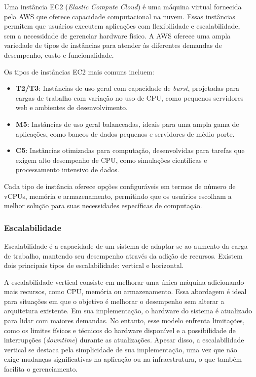 Uma instância EC2 (\emph{Elastic Compute Cloud}) é uma máquina virtual fornecida pela AWS que oferece capacidade computacional na nuvem. Essas instâncias permitem que usuários executem aplicações com flexibilidade e escalabilidade, sem a necessidade de gerenciar hardware físico. A AWS oferece uma ampla variedade de tipos de instâncias para atender às diferentes demandas de desempenho, custo e funcionalidade.

Os tipos de instâncias EC2 mais comuns incluem:

\begin{itemize}
    \item \textbf{T2/T3}: Instâncias de uso geral com capacidade de \emph{burst}, projetadas para cargas de trabalho com variação no uso de CPU, como pequenos servidores web e ambientes de desenvolvimento.
    \item \textbf{M5}: Instâncias de uso geral balanceadas, ideais para uma ampla gama de aplicações, como bancos de dados pequenos e servidores de médio porte.
    \item \textbf{C5}: Instâncias otimizadas para computação, desenvolvidas para tarefas que exigem alto desempenho de CPU, como simulações científicas e processamento intensivo de dados.
\end{itemize}

Cada tipo de instância oferece opções configuráveis em termos de número de vCPUs, memória e armazenamento, permitindo que os usuários escolham a melhor solução para suas necessidades específicas de computação.

\subsubsection{Escalabilidade}



Escalabilidade é a capacidade de um sistema de adaptar-se ao aumento da carga de trabalho, mantendo seu desempenho através da adição de recursos. Existem dois principais tipos de escalabilidade: vertical e horizontal\cite{what-is-scalability}.

A escalabilidade vertical consiste em melhorar uma única máquina adicionando mais recursos, como CPU, memória ou armazenamento\cite{what-is-scalability}. Essa abordagem é ideal para situações em que o objetivo é melhorar o desempenho sem alterar a arquitetura existente. Em sua implementação, o hardware do sistema é atualizado para lidar com maiores demandas. No entanto, esse modelo enfrenta limitações, como os limites físicos e técnicos do hardware disponível e a possibilidade de interrupções (\emph{downtime}) durante as atualizações. Apesar disso, a escalabilidade vertical se destaca pela simplicidade de sua implementação, uma vez que não exige mudanças significativas na aplicação ou na infraestrutura, o que também facilita o gerenciamento.

